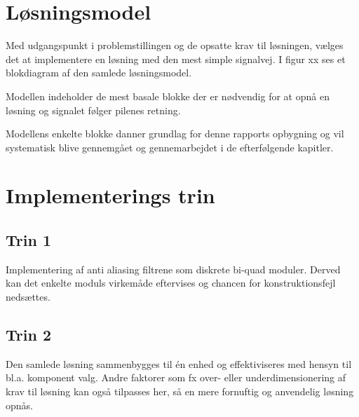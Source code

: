 \section{Løsningsmodel}
Med udgangspunkt i problemstillingen og de opsatte krav til løsningen, vælges det at implementere en løsning med den mest simple signalvej.
I figur xx ses et blokdiagram af den samlede løsningsmodel.


Modellen indeholder de mest basale blokke der er nødvendig for at opnå en løsning og signalet følger pilenes retning.

Modellens enkelte blokke danner grundlag for denne rapports opbygning og vil systematisk blive gennemgået og gennemarbejdet i de efterfølgende kapitler.


\section{Implementerings trin}

\subsection{Trin 1}
Implementering af anti aliasing filtrene som diskrete bi-quad moduler. 
Derved kan det enkelte moduls virkemåde eftervises og chancen for konstruktionsfejl nedsættes.

\subsection{Trin 2}
Den samlede løsning sammenbygges til én enhed og effektiviseres med hensyn til bl.a. komponent valg. 
Andre faktorer som fx over- eller underdimensionering af krav til løsning kan også tilpasses her, så en mere fornuftig og anvendelig løsning opnås.
